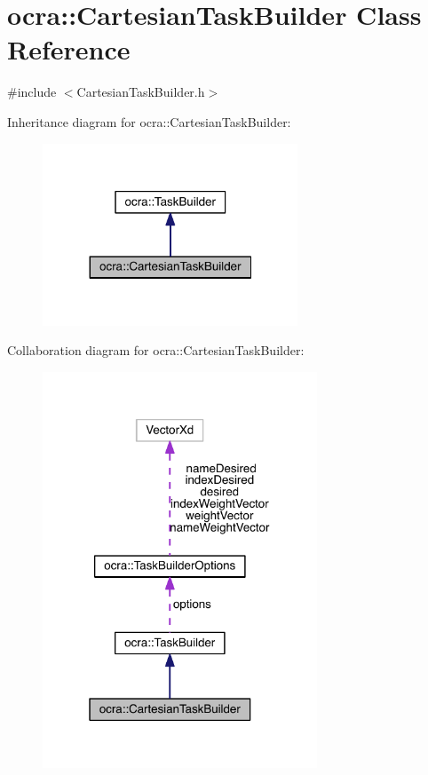\hypertarget{classocra_1_1CartesianTaskBuilder}{}\section{ocra\+:\+:Cartesian\+Task\+Builder Class Reference}
\label{classocra_1_1CartesianTaskBuilder}


{\ttfamily \#include $<$Cartesian\+Task\+Builder.\+h$>$}



Inheritance diagram for ocra\+:\+:Cartesian\+Task\+Builder\+:\nopagebreak
\begin{figure}[H]
\begin{center}
\leavevmode
\includegraphics[width=215pt]{d0/d4d/classocra_1_1CartesianTaskBuilder__inherit__graph}
\end{center}
\end{figure}


Collaboration diagram for ocra\+:\+:Cartesian\+Task\+Builder\+:\nopagebreak
\begin{figure}[H]
\begin{center}
\leavevmode
\includegraphics[width=232pt]{d9/d96/classocra_1_1CartesianTaskBuilder__coll__graph}
\end{center}
\end{figure}
